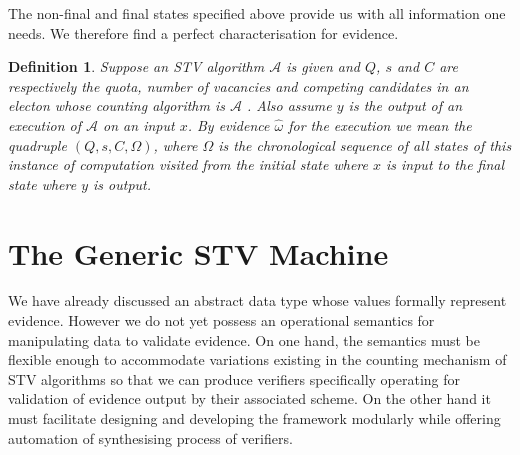 \documentclass[10pt,conference]{IEEEtran}
\newtheorem{definition}{Definition}
\begin{document}
The non-final and final states specified above provide us with all information one needs. We therefore find a perfect characterisation for evidence. 
\begin{definition}\label{formalEv}
Suppose an STV algorithm $\mathcal{A}$ is given and $Q$, $s$ and $C$ are respectively the quota, number of vacancies and competing candidates in an electon whose counting algorithm is $\mathcal{A}$ . Also assume  $y$ is the output of an execution of $\mathcal{A}$ on an input $x$. By evidence $\hat{\omega}$ for the execution  we mean the quadruple $(Q,s,C,\Omega)$, where $\Omega$ is the chronological sequence of all states of this instance of computation visited from the initial state where $x$ is input to the final state where $y$ is output.   
\end{definition}
\section{The Generic STV  Machine}
\label{sec:Machine}
\setlength{\abovedisplayskip}{0.5em}
\setlength{\belowdisplayskip}{0.5em}
We have already discussed an abstract data type whose values  formally represent evidence. However we do not yet possess an operational semantics for manipulating data to validate evidence.   On one hand, the semantics must be flexible enough to accommodate variations existing in the counting mechanism of STV algorithms so that we can produce verifiers  specifically operating for validation of evidence output by their associated scheme. On the other hand it must facilitate designing and developing the framework modularly while offering automation of synthesising process of verifiers.
\end{document}
